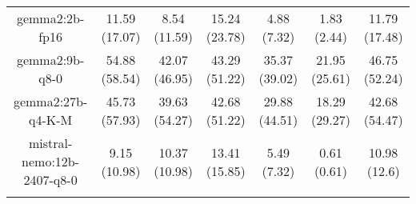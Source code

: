 \begin{table}[]
{\begin{tabular}{ccccccc}
        \multicolumn{1}{c|}{gemma2:2b-fp16} & 11.59 (17.07) & 8.54 (11.59) & \multicolumn{1}{c|}{15.24 (23.78)} & 4.88 (7.32) & \multicolumn{1}{c|}{1.83 (2.44)} & 11.79 (17.48) \\
        

        \multicolumn{1}{c|}{gemma2:9b-q8-0} & 54.88 (58.54) & 42.07 (46.95) & \multicolumn{1}{c|}{43.29 (51.22)} & 35.37 (39.02) & \multicolumn{1}{c|}{21.95 (25.61)} & 46.75 (52.24) \\
        

        \multicolumn{1}{c|}{gemma2:27b-q4-K-M} & 45.73 (57.93) & 39.63 (54.27) & \multicolumn{1}{c|}{42.68 (51.22)} & 29.88 (44.51) & \multicolumn{1}{c|}{18.29 (29.27)} & 42.68 (54.47) \\
        

        \multicolumn{1}{c|}{mistral-nemo:12b-2407-q8-0} & 9.15 (10.98) & 10.37 (10.98) & \multicolumn{1}{c|}{13.41 (15.85)} & 5.49 (7.32) & \multicolumn{1}{c|}{0.61 (0.61)} & 10.98 (12.6) \\
        
\\ \hline
\end{tabular}%
}
\end{table}
    